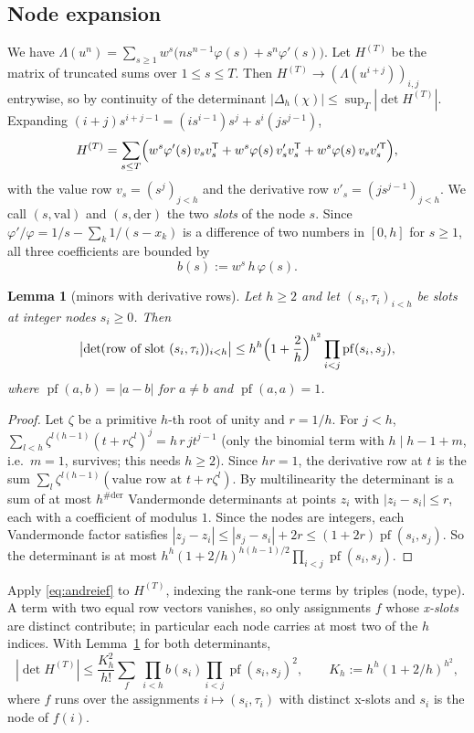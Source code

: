 \documentclass[11pt]{amsart}
\newtheorem{lemma}[theorem]{Lemma}
\theoremstyle{definition}
\theoremstyle{remark}
\numberwithin{equation}{section}
\begin{document}
\subsection{Node expansion}
We have $\Lambda(u^n)=\sum_{s\ge1}w^s\bigl(ns^{n-1}\varphi(s)+s^n\varphi'(s)\bigr)$. Let $H^{(T)}$ be the matrix of
truncated sums over $1\le s\le T$. Then $H^{(T)}\to(\Lambda(u^{i+j}))_{i,j}$ entrywise, so by continuity of the
determinant $|\Delta_h(\chi)|\le\sup_T|\det H^{(T)}|$. Expanding $(i+j)s^{i+j-1}=(is^{i-1})s^j+s^i(js^{j-1})$,
\[
  H^{(T)}=\sum_{s\le T}\Bigl(w^s\varphi'(s)\,v_sv_s^{\mathsf T}+w^s\varphi(s)\,v'_sv_s^{\mathsf T}+w^s\varphi(s)\,v_sv_s'^{\mathsf T}\Bigr),
\]
with the value row $v_s=(s^j)_{j<h}$ and the derivative row $v'_s=(js^{j-1})_{j<h}$. We call $(s,\mathrm{val})$ and
$(s,\mathrm{der})$ the two \emph{slots} of the node $s$. Since $\varphi'/\varphi=1/s-\sum_k1/(s-x_k)$ is a difference of two
numbers in $[0,h]$ for $s\ge1$, all three coefficients are bounded by
\[
  b(s):=w^s\,h\,\varphi(s).
\]

\begin{lemma}[minors with derivative rows]\label{lem:slotdet}
Let $h\ge2$ and let $(s_i,\tau_i)_{i<h}$ be slots at integer nodes $s_i\ge0$. Then
\[
  \bigl|\det(\text{row of slot }(s_i,\tau_i))_{i<h}\bigr|\le h^h\Bigl(1+\frac2h\Bigr)^{h^2}\prod_{i<j}\operatorname{pf}(s_i,s_j),
\]
where $\operatorname{pf}(a,b)=|a-b|$ for $a\ne b$ and $\operatorname{pf}(a,a)=1$.
\end{lemma}

\begin{proof}
Let $\zeta$ be a primitive $h$-th root of unity and $r=1/h$. For $j<h$,
$\sum_{l<h}\zeta^{l(h-1)}(t+r\zeta^l)^j=h\,r\,jt^{j-1}$ (only the binomial term with $h\mid h-1+m$, i.e.\ $m=1$, survives;
this needs $h\ge2$). Since $hr=1$, the derivative row at $t$ is the sum
$\sum_l\zeta^{l(h-1)}(\text{value row at }t+r\zeta^l)$. By multilinearity the determinant is a sum of at most
$h^{\#\mathrm{der}}$ Vandermonde determinants at points $z_i$ with $|z_i-s_i|\le r$, each with a coefficient of modulus
$1$. Since the nodes are integers, each Vandermonde factor satisfies
$|z_j-z_i|\le|s_j-s_i|+2r\le(1+2r)\operatorname{pf}(s_i,s_j)$.
So the determinant is at most $h^h(1+2/h)^{h(h-1)/2}\prod_{i<j}\operatorname{pf}(s_i,s_j)$.
\end{proof}

Apply \eqref{eq:andreief} to $H^{(T)}$, indexing the rank-one terms by triples (node, type). A term with two equal
row vectors vanishes, so only assignments $f$ whose \emph{x-slots} are distinct contribute; in particular each node
carries at most two of the $h$ indices. With Lemma~\ref{lem:slotdet} for both determinants,
\begin{equation}\label{eq:pattern}
  |\det H^{(T)}|\le\frac{K_h^2}{h!}\sum_{f}\ \prod_{i<h}b(s_i)\prod_{i<j}\operatorname{pf}(s_i,s_j)^2,\qquad K_h:=h^h(1+2/h)^{h^2},
\end{equation}
where $f$ runs over the assignments $i\mapsto(s_i,\tau_i)$ with distinct x-slots and $s_i$ is the node of $f(i)$.
\end{document}
